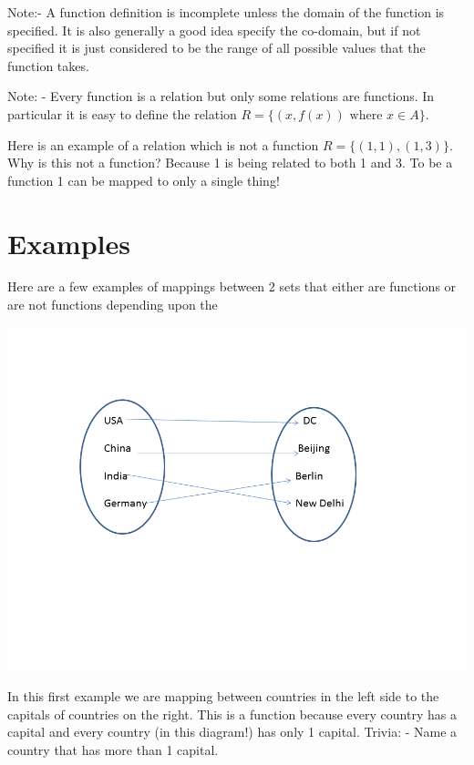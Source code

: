 \documentclass[12pt]{article}
\begin{document}
Note:- A function definition is incomplete unless the domain of the function is specified. It is also generally a good idea specify the co-domain, but if not specified it is just considered to be the range of all possible values that the function takes.

Note: - Every function is a relation but only some relations are functions. In particular it is easy to define the relation $R = \{(x, f(x)) \text{ where }  x \in A \}$. 

Here is an example of a relation which is not a function $R = \{(1,1), (1,3)\}$. Why is this not a function? Because 1 is being related to both 1 and 3. To be a function 1 can be mapped to only a single thing!

\section*{Examples}

Here are a few examples of mappings between 2 sets that either are functions or are not functions depending upon the 

\includegraphics[scale=0.5]{func1.png}

In this first example we are mapping between countries in the left side to the capitals of countries on the right. This is a function because every country has a capital and every country (in this diagram!) has only 1 capital. Trivia: - Name a country that has more than 1 capital.
\end{document}
